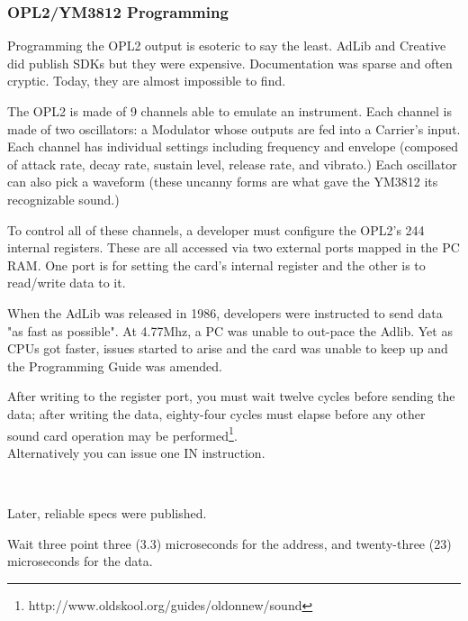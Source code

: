 \subsubsection{OPL2/YM3812 Programming}
\par
Programming the OPL2 output is esoteric to say the least. AdLib and Creative did publish SDKs but they were expensive.  Documentation was sparse and often cryptic. Today, they are almost impossible to find.\\
\par
The OPL2 is made of 9 channels able to emulate an instrument. Each channel is made of two oscillators: a Modulator whose outputs are fed into a Carrier's input. Each channel has individual settings including frequency and envelope (composed of attack rate, decay rate, sustain level, release rate, and vibrato.) Each oscillator can also pick a waveform (these uncanny forms are what gave the YM3812 its recognizable sound.)\\
\par
 To control all of these channels, a developer must configure the OPL2's 244 internal registers. These are all accessed via two external ports mapped in the PC RAM. One port is for setting the card's internal register and the other is to read/write data to it.\\
\par
\begin{minipage}{\textwidth}

\end{minipage}
\par
When the AdLib was released in 1986, developers were instructed to send data "as fast as possible". At 4.77Mhz, a PC was unable to out-pace the Adlib. Yet as CPUs got faster, issues started to arise and the card was unable to keep up and the Programming Guide was amended.\\
\par

\begin{fancyquotes}
After writing to the register port, you must wait twelve cycles before sending the data; after writing the data, eighty-four cycles must elapse before any other sound card operation may be performed\footnote{http://www.oldskool.org/guides/oldonnew/sound}.
 \bigskip \\
 Alternatively you can issue one IN instruction.
 \bigskip \\
 \end{fancyquotes}
\\
\par
Later, reliable specs were published.\\
\par
\begin{fancyquotes}
Wait three point three (3.3) microseconds for the address, and twenty-three (23) microseconds for the data.\\
 \end{fancyquotes}
 

